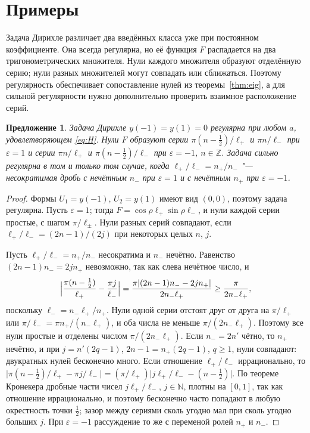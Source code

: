 \documentclass[12pt,a4paper]{article}
\numberwithin{equation}{section}
\newtheorem{proposition}{Предложение}
\theoremstyle{definition}
\newcommand{\abs}[1]{\lvert#1\rvert}
\begin{document}
\section{Примеры}

Задача Дирихле различает два введённых класса уже при постоянном коэффициенте.
Она всегда регулярна, но её функция $F$ распадается на два тригонометрических
множителя. Нули каждого множителя образуют отделённую серию; нули разных
множителей могут совпадать или сближаться. Поэтому регулярность обеспечивает
сопоставление нулей из теоремы~\ref{thm:eig}, а для сильной регулярности
нужно дополнительно проверить взаимное расположение серий.

\begin{proposition}\label{prop:dir}
Задача Дирихле $y(-1)=y(1)=0$ регулярна при любом $a$, удовлетворяющем \eqref{eq:H}. Нули $F$
образуют серии $\pi(n-\frac12)/\ell_+$ и $\pi n/\ell_-$ при $\varepsilon=1$ и серии $\pi n/\ell_+$ и
$\pi(n-\frac12)/\ell_-$ при $\varepsilon=-1$, $n\in\mathbb Z$. Задача сильно регулярна в том и
только том случае, когда $\ell_+/\ell_-=n_+/n_-$ "--- несократимая дробь с нечётным $n_-$ при
$\varepsilon=1$ и с нечётным $n_+$ при $\varepsilon=-1$.
\end{proposition}

\begin{proof}
Формы $U_1=y(-1)$, $U_2=y(1)$ имеют вид $(0,0)$, поэтому задача регулярна. Пусть
$\varepsilon=1$; тогда $F=\cos\rho\ell_+\sin\rho\ell_-$, и нули каждой серии простые, с шагом
$\pi/\ell_\pm$. Нули разных серий совпадают, если $\ell_+/\ell_-=(2n-1)/(2j)$ при некоторых целых
$n$, $j$.

Пусть $\ell_+/\ell_-=n_+/n_-$ несократима и $n_-$ нечётно. Равенство $(2n-1)n_-=2jn_+$
невозможно, так как слева нечётное число, и
\[
 \Bigl\lvert\frac{\pi(n-\frac12)}{\ell_+}-\frac{\pi j}{\ell_-}\Bigr\rvert
 =\frac{\pi\abs{(2n-1)n_--2jn_+}}{2n_-\ell_+}\ge\frac{\pi}{2n_-\ell_+},
\]
поскольку $\ell_-=n_-\ell_+/n_+$. Нули одной серии отстоят друг от друга на $\pi/\ell_+$ или
$\pi/\ell_-=\pi n_+/(n_-\ell_+)$, и оба числа не меньше $\pi/(2n_-\ell_+)$. Поэтому все нули
простые и отделены числом $\pi/(2n_-\ell_+)$. Если $n_-=2n'$ чётно, то $n_+$ нечётно, и при $j=n'(2q-1)$,
$2n-1=n_+(2q-1)$, $q\ge1$, нули совпадают: двукратных нулей бесконечно много. Если отношение
$\ell_+/\ell_-$ иррационально, то
$\abs{\pi(n-\frac12)/\ell_+-\pi j/\ell_-}=(\pi/\ell_+)\abs{j\ell_+/\ell_--(n-\frac12)}$. По
теореме Кронекера дробные части чисел $j\ell_+/\ell_-$, $j\in\mathbb N$, плотны на $[0,1]$, так как
отношение иррационально, и поэтому бесконечно часто попадают в любую
окрестность точки
 $\frac12$; зазор
между сериями сколь угодно мал при сколь угодно больших $j$. При $\varepsilon=-1$ рассуждение то
же с переменой ролей $n_+$ и $n_-$.
\end{proof}
\end{document}
